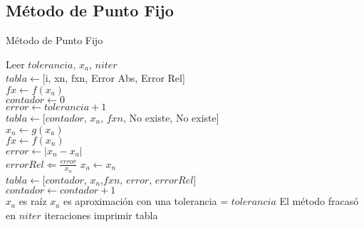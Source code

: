 \documentclass[12pt]{article}
\begin{document}
\subsection{Método de Punto Fijo}
\begin{algorithm}[H]
	\caption{Método de Punto Fijo}
	\SetAlgoLined
	Leer $tolerancia$, $x_a$, $niter$\\
	$tabla \leftarrow $[i, xn, fxn, Error Abs, Error Rel] \\
	$fx \leftarrow f(x_a)$\\
	$contador \leftarrow 0$ \\
	$error \leftarrow tolerancia + 1$\\
	$tabla \leftarrow $[$contador$, $x_n$, $fxn$, No existe, No existe] \\
	{
		$x_n \leftarrow g(x_a)$\\
		$fx \leftarrow f(x_n)$\\
		$error \leftarrow |x_n - x_a|$\\
		$error Rel \Leftarrow \frac{error}{x_n}$
		$x_a \leftarrow x_n$\\
		$tabla \leftarrow $[$contador$, $x_n$,$fxn$, $error$, $error Rel$] \\
		$contador \leftarrow contador + 1$\\
	}
	{$x_a$ es raíz}
	{$x_a$ es aproximación con una tolerancia = $tolerancia$}
	\Else
	{El método fracasó en $niter$ iteraciones}
	imprimir tabla
\end{algorithm}
\end{document}
